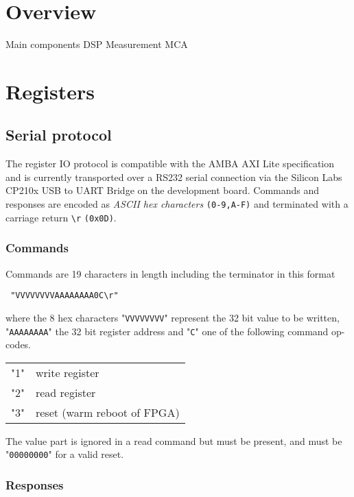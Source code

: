 \documentclass{article}
\newcommand{\code}[1]{\texttt{#1}}
\newenvironment{fielddesc}
{\texttt\bgroup}
{\egroup}
\newcommand{\return}{\code{\textbackslash r}}
\begin{document}
\section{Overview}
Main components 
DSP 
Measurement
MCA



\section{Registers}

\subsection{Serial protocol}

The register IO protocol is compatible with the AMBA AXI Lite specification and
is currently transported over a RS232 serial connection via the Silicon Labs
CP210x USB to UART Bridge on the development board.
Commands and responses are encoded as \emph{ASCII hex characters}
\code{(0-9,A-F)} and terminated with a carriage return \return{} \code{(0x0D)}.

\subsubsection{Commands}

Commands are 19 characters in length including the terminator in this format

\begin{fielddesc}
"VVVVVVVVAAAAAAAA0C\return" 
\end{fielddesc}

where the 8 hex characters "\code{VVVVVVVV}" represent the 32 bit value to be
written, "\code{AAAAAAAA}" the 32 bit register address and "\code{C}" one of the
following command op-codes.

\begin{fielddesc}
\begin{tabular}{l l}
"1" & write register \\
"2" & read register \\
"3" & reset (warm reboot of FPGA)
\end{tabular}
\end{fielddesc} 

The value part is ignored in a read command but must be present, and must be
"\code{00000000}" for a valid reset.

\subsubsection{Responses}
\end{document}
